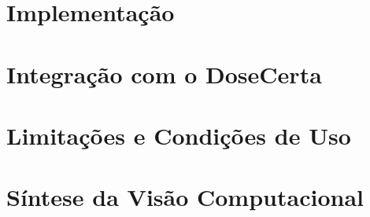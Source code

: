 
\section{Implementação}
\label{sec:implementacao-visao-computacional}


\section{Integração com o DoseCerta}
\label{sec:integracao-visao-computacional}


\section{Limitações e Condições de Uso}
\label{sec:limitacoes-visao-computacional}


\section{Síntese da Visão Computacional}
\label{sec:sintese-visao-computacional}

